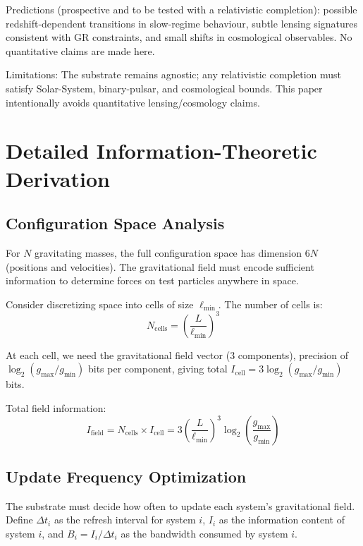 \documentclass[usenatbib]{mnras}
\begin{document}
Predictions (prospective and to be tested with a relativistic completion): possible redshift-dependent transitions in slow-regime behaviour, subtle lensing signatures consistent with GR constraints, and small shifts in cosmological observables. No quantitative claims are made here.

Limitations: The substrate remains agnostic; any relativistic completion must satisfy Solar-System, binary-pulsar, and cosmological bounds. This paper intentionally avoids quantitative lensing/cosmology claims.

\appendix

\section{Detailed Information-Theoretic Derivation}

\subsection{Configuration Space Analysis}

For $N$ gravitating masses, the full configuration space has dimension $6N$ (positions and velocities). The gravitational field must encode sufficient information to determine forces on test particles anywhere in space.

Consider discretizing space into cells of size $\ell_{\text{min}}$. The number of cells is:
\begin{equation}
N_{\text{cells}} = \left(\frac{L}{\ell_{\text{min}}}\right)^3
\end{equation}

At each cell, we need the gravitational field vector (3 components), precision of $\log_2(g_{\text{max}}/g_{\text{min}})$ bits per component, giving total $I_{\text{cell}} = 3 \log_2(g_{\text{max}}/g_{\text{min}})$ bits.

Total field information:
\begin{equation}
I_{\text{field}} = N_{\text{cells}} \times I_{\text{cell}} = 3\left(\frac{L}{\ell_{\text{min}}}\right)^3 \log_2\left(\frac{g_{\text{max}}}{g_{\text{min}}}\right)
\end{equation}

\subsection{Update Frequency Optimization}

The substrate must decide how often to update each system's gravitational field. Define $\Delta t_i$ as the refresh interval for system $i$, $I_i$ as the information content of system $i$, and $B_i = I_i/\Delta t_i$ as the bandwidth consumed by system $i$.
\end{document}

